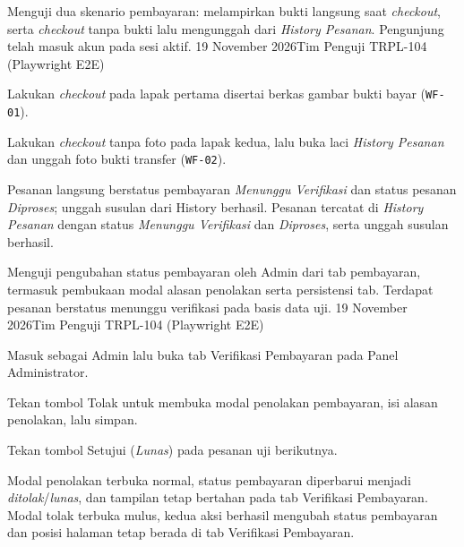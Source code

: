 {Menguji dua skenario pembayaran: melampirkan bukti langsung saat \textit{checkout}, serta \textit{checkout} tanpa bukti lalu mengunggah dari \textit{History Pesanan}.}
{Pengunjung telah masuk akun pada sesi aktif.}
{19 November 2026}{Tim Penguji TRPL-104 (Playwright E2E)}
{\begin{uclist}
  \item Lakukan \textit{checkout} pada lapak pertama disertai berkas gambar bukti bayar (\texttt{WF-01}).
  \item Lakukan \textit{checkout} tanpa foto pada lapak kedua, lalu buka laci \textit{History Pesanan} dan unggah foto bukti transfer (\texttt{WF-02}).
\end{uclist}}
{Pesanan langsung berstatus pembayaran \textit{Menunggu Verifikasi} dan status pesanan \textit{Diproses}; unggah susulan dari History berhasil.}
{Pesanan tercatat di \textit{History Pesanan} dengan status \textit{Menunggu Verifikasi} dan \textit{Diproses}, serta unggah susulan berhasil.}

{Menguji pengubahan status pembayaran oleh Admin dari tab pembayaran, termasuk pembukaan modal alasan penolakan serta persistensi tab.}
{Terdapat pesanan berstatus menunggu verifikasi pada basis data uji.}
{19 November 2026}{Tim Penguji TRPL-104 (Playwright E2E)}
{\begin{uclist}
  \item Masuk sebagai Admin lalu buka tab Verifikasi Pembayaran pada Panel Administrator.
  \item Tekan tombol Tolak untuk membuka modal penolakan pembayaran, isi alasan penolakan, lalu simpan.
  \item Tekan tombol Setujui (\textit{Lunas}) pada pesanan uji berikutnya.
\end{uclist}}
{Modal penolakan terbuka normal, status pembayaran diperbarui menjadi \textit{ditolak}/\textit{lunas}, dan tampilan tetap bertahan pada tab Verifikasi Pembayaran.}
{Modal tolak terbuka mulus, kedua aksi berhasil mengubah status pembayaran dan posisi halaman tetap berada di tab Verifikasi Pembayaran.}

